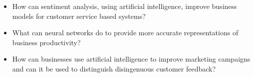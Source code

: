 

\begin{itemize}
\item How can sentiment analysis, using artificial intelligence, improve business models for customer service based systems?
\item What can neural networks do to provide more accurate representations of business productivity?
\item How can businesses use artificial intelligence to improve marketing campaigns and can it be used to distinguish disingenuous customer feedback? 
\end{itemize}


